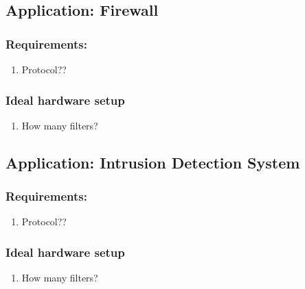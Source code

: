 \subsection{Application: Firewall}

\subsubsection{Requirements:}
\begin{enumerate}
    \item Protocol??
\end{enumerate}

\subsubsection{Ideal hardware setup}
\begin{enumerate}
    \item How many filters?
\end{enumerate}

\subsection{Application: Intrusion Detection System }

\subsubsection{Requirements:}
\begin{enumerate}
    \item Protocol??
\end{enumerate}

\subsubsection{Ideal hardware setup}
\begin{enumerate}
    \item How many filters?
\end{enumerate}


